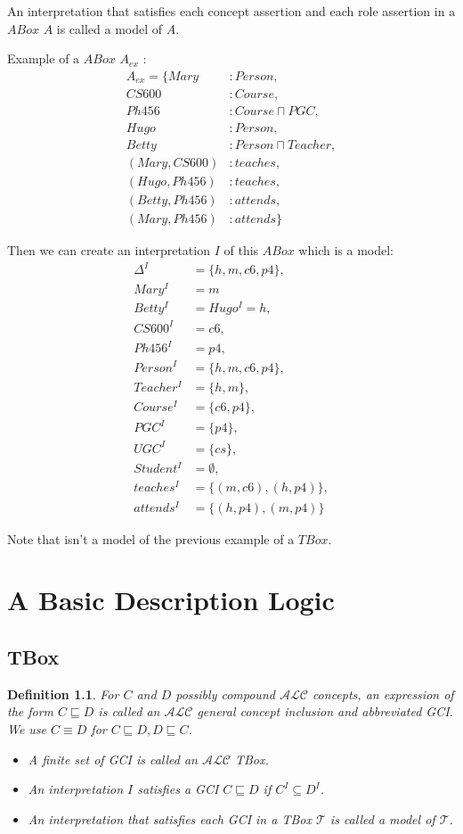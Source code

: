 \documentclass[a4paper,11pt]{report}
\newcommand*{\alc}{$\mathcal{ALC}$ }
\newcommand*{\sso}{\sqsubseteq}
\begin{document}
An interpretation that satisfies each concept assertion and each role assertion in a $ABox$ $A$ is called a model of $A$.

Example of a $ABox$ $A_{ex}$ :
\begin{align*}
A_{ex} = \{ Mary &: Person, \\
CS600 &: Course,\\
Ph456 &: Course \sqcap PGC,\\
Hugo &: Person,\\
Betty &: Person \sqcap Teacher,\\
(Mary,CS600) &: teaches,\\
(Hugo,Ph456) &: teaches,\\
(Betty,Ph456) &: attends,\\
(Mary,Ph456) &: attends \}
\end{align*}

Then we can create an interpretation $I$ of this $ABox$ which is a model:
\begin{align*}
\Delta^I &= \{h,m,c6,p4\}, \\
Mary^I &= m \\
Betty^I &= Hugo^I = h, \\
CS600^I &=  c6,\\
Ph456^I &=  p4,\\
Person^I &= \{h,m,c6,p4\},\\
Teacher^I &= \{h,m\},\\
Course^I &= \{c6,p4\},\\
PGC^I &= \{p4\},\\
UGC^I &= \{cs\},\\
Student^I &= \emptyset,\\
teaches^I &= \{(m,c6),(h,p4)\},\\
attends^I &= \{(h,p4),(m,p4)\}
\end{align*}

Note that isn't a model of the previous example of a $TBox$.

\chapter{A Basic Description Logic}

\section{TBox}

\newtheorem{GCI}{Definition}[section]
\begin{GCI}
  For $C$ and $D$ possibly compound \alc concepts, an expression of the form $C
  \sso D$ is called an \alc \textit{general concept inclusion} and abbreviated
  GCI. We use $C \equiv D$ for $C \sso D, D \sso C$.
  \begin{itemize}
  \item A finite set of GCI is called an \alc TBox.
  \item An interpretation $I$ satisfies a GCI $C \sso D$ if $C^I \subseteq D^I$.
  \item An interpretation that satisfies each GCI in a TBox $\mathcal{T}$ is called a model of $\mathcal{T}$.
  \end{itemize}
\end{GCI}
\end{document}
